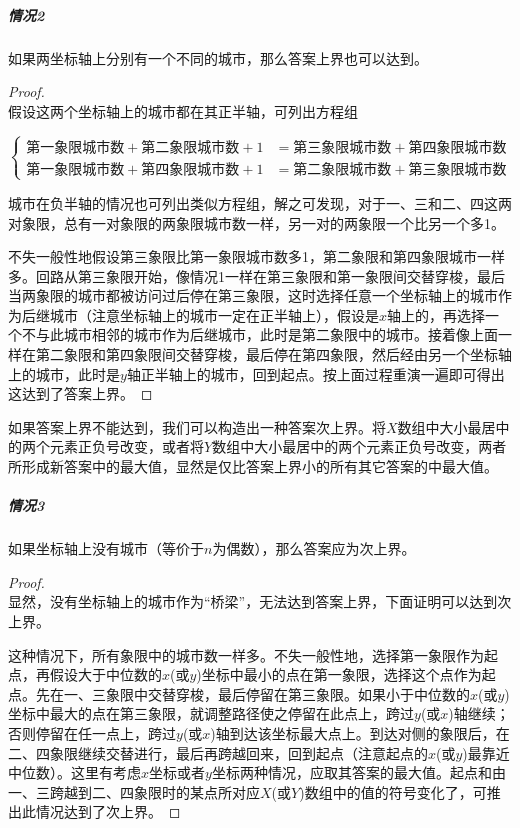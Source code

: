 \documentclass[UTF8]{ctexart}
\theoremstyle{nonumberplain}
\newtheorem{proof}{\hspace{1em}证明：}
\begin{document}
			\subparagraph{情况2}
			如果两坐标轴上分别有一个不同的城市，那么答案上界也可以达到。
			
			\begin{proof}\mbox{}\\
			
				假设这两个坐标轴上的城市都在其正半轴，可列出方程组
				
				$$\left\{\begin{aligned}
					\mbox{第一象限城市数}+\mbox{第二象限城市数}+1&=\mbox{第三象限城市数}+\mbox{第四象限城市数}\\
					\mbox{第一象限城市数}+\mbox{第四象限城市数}+1&=\mbox{第二象限城市数}+\mbox{第三象限城市数}
				\end{aligned}\right.$$
				
				城市在负半轴的情况也可列出类似方程组，解之可发现，对于一、三和二、四这两对象限，总有一对象限的两象限城市数一样，另一对的两象限一个比另一个多1。
				
				不失一般性地假设第三象限比第一象限城市数多1，第二象限和第四象限城市一样多。回路从第三象限开始，像情况1一样在第三象限和第一象限间交替穿梭，最后当两象限的城市都被访问过后停在第三象限，这时选择任意一个坐标轴上的城市作为后继城市（注意坐标轴上的城市一定在正半轴上），假设是$x$轴上的，再选择一个不与此城市相邻的城市作为后继城市，此时是第二象限中的城市。接着像上面一样在第二象限和第四象限间交替穿梭，最后停在第四象限，然后经由另一个坐标轴上的城市，此时是$y$轴正半轴上的城市，回到起点。按上面过程重演一遍即可得出这达到了答案上界。
			\end{proof}
			
			如果答案上界不能达到，我们可以构造出一种答案次上界。将$X$数组中大小最居中的两个元素正负号改变，或者将$Y$数组中大小最居中的两个元素正负号改变，两者所形成新答案中的最大值，显然是仅比答案上界小的所有其它答案的中最大值。
			
			\subparagraph{情况3}
			如果坐标轴上没有城市（等价于$n$为偶数），那么答案应为次上界。
			
			\begin{proof}\mbox{}\\
			
				显然，没有坐标轴上的城市作为“桥梁”，无法达到答案上界，下面证明可以达到次上界。
				
				这种情况下，所有象限中的城市数一样多。不失一般性地，选择第一象限作为起点，再假设大于中位数的$x$(或$y$)坐标中最小的点在第一象限，选择这个点作为起点。先在一、三象限中交替穿梭，最后停留在第三象限。如果小于中位数的$x$(或$y$)坐标中最大的点在第三象限，就调整路径使之停留在此点上，跨过$y$(或$x$)轴继续；否则停留在任一点上，跨过$y$(或$x$)轴到达该坐标最大点上。到达对侧的象限后，在二、四象限继续交替进行，最后再跨越回来，回到起点（注意起点的$x$(或$y$)最靠近中位数）。这里有考虑$x$坐标或者$y$坐标两种情况，应取其答案的最大值。起点和由一、三跨越到二、四象限时的某点所对应$X$(或$Y$)数组中的值的符号变化了，可推出此情况达到了次上界。
			\end{proof}
			
\end{document}
